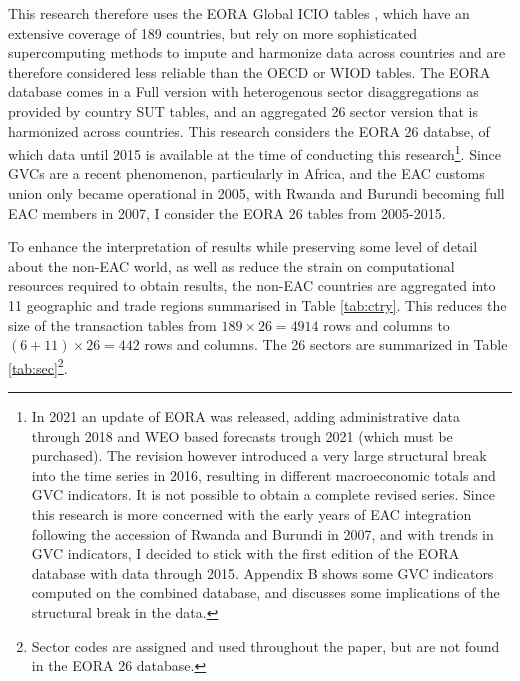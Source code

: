 \documentclass[a4paper]{article}
\begin{document}
This research therefore uses the EORA Global ICIO tables \citep{lenzen2012mapping, lenzen2013building}, which have an extensive coverage of 189 countries, but rely on more sophisticated supercomputing methods to impute and harmonize data across countries and are therefore considered less reliable than the OECD or WIOD tables. %
The EORA database comes in a Full version with heterogenous sector disaggregations as provided by country SUT tables, and an aggregated 26 sector version that is harmonized across countries. This research considers the EORA 26 databse, of which data until 2015 is available at the time of conducting this research\footnote{In 2021 an update of EORA was released, adding administrative data through 2018 and WEO based forecasts trough 2021 (which must be purchased). The revision however introduced a very large structural break into the time series in 2016, resulting in different macroeconomic totals and GVC indicators. It is not possible to obtain a complete revised series. Since this research is more concerned with the early years of EAC integration following the accession of Rwanda and Burundi in 2007, and with trends in GVC indicators, I decided to stick with the first edition of the EORA database with data through 2015. Appendix B shows some GVC indicators computed on the combined database, and discusses some implications of the structural break in the data. }. Since GVCs are a recent phenomenon, particularly in Africa, and the EAC customs union only became operational in 2005, with Rwanda and Burundi becoming full EAC members in 2007, I consider the EORA 26 tables from 2005-2015. \newline

To enhance the interpretation of results while preserving some level of detail about the non-EAC world, as well as reduce the strain on computational resources required to obtain results, the non-EAC countries are aggregated into 11 geographic and trade regions summarised in Table \ref{tab:ctry}. This reduces the size of the transaction tables from $189 \times 26 = 4914$ rows and columns to $(6 + 11)\times 26 = 442$ rows and columns. The 26 sectors are summarized in Table \ref{tab:sec}\footnote{Sector codes are assigned and used throughout the paper, but are not found in the EORA 26 database.}. \newline
\end{document}
